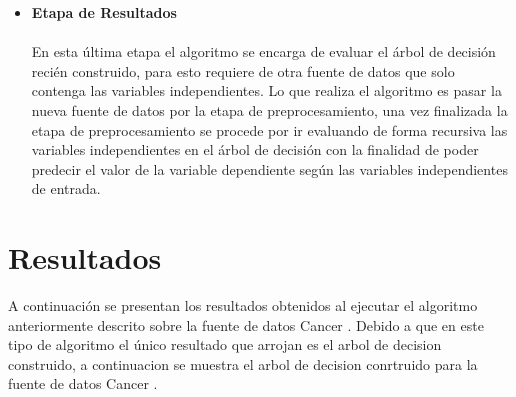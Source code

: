\documentclass[letterpaper, 10 pt, conference]{ieeeconf}
\begin{document}
\begin{itemize}[leftmargin=*]
    \item \textbf{Etapa de Resultados}
    \\ \\ En esta última etapa el algoritmo se encarga de evaluar el árbol de decisión recién construido, para esto requiere de otra fuente de datos que solo contenga las variables independientes. Lo que realiza el algoritmo es pasar la nueva fuente de datos por la etapa de preprocesamiento, una vez finalizada la etapa de preprocesamiento se procede por ir evaluando de forma recursiva las variables independientes en el árbol de decisión con la finalidad de poder predecir el valor de la variable dependiente según las variables independientes de entrada.\\
\end{itemize}

\newpage

\section{Resultados}

A continuación se presentan los resultados obtenidos al ejecutar el algoritmo anteriormente descrito sobre la fuente de datos Cancer \cite{dataset:2019}. Debido a que en este tipo de algoritmo el único resultado que arrojan es el arbol de decision construido, a continuacion se muestra el arbol de decision conrtruido para la fuente de datos Cancer \cite{dataset:2019}.\\
\end{document}
